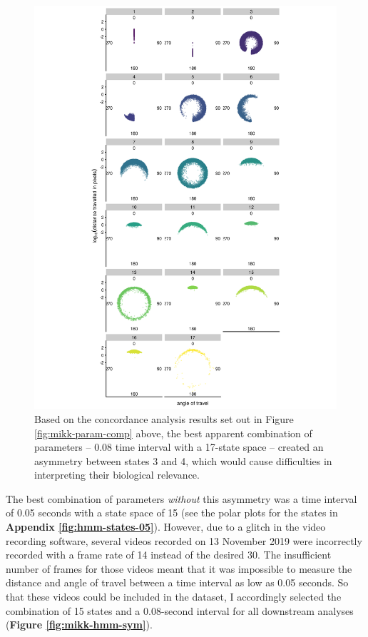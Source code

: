 \documentclass[
]{book}
\begin{document}
\begin{figure}
\includegraphics[width=1\linewidth]{figs/mikk_behaviour/0.08_17_polar_all_dge} \caption{Based on the concordance analysis results set out in Figure \ref{fig:mikk-param-comp} above, the best apparent combination of parameters -- 0.08 time interval with a 17-state space -- created an asymmetry between states 3 and 4, which would cause difficulties in interpreting their biological relevance.}\label{fig:mikk-hmm-asym}
\end{figure}

The best combination of parameters \emph{without} this asymmetry was a time interval of 0.05 seconds with a state space of 15 (see the polar plots for the states in \textbf{Appendix \ref{fig:hmm-states-05}}). However, due to a glitch in the video recording software, several videos recorded on 13 November 2019 were incorrectly recorded with a frame rate of 14 instead of the desired 30. The insufficient number of frames for those videos meant that it was impossible to measure the distance and angle of travel between a time interval as low as 0.05 seconds. So that these videos could be included in the dataset, I accordingly selected the combination of 15 states and a 0.08-second interval for all downstream analyses (\textbf{Figure \ref{fig:mikk-hmm-sym}}).
\end{document}
